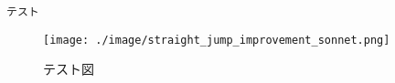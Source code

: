 \documentclass[dvipdfmx]{jsreport}
\begin{document}
\begin{tcolorbox}[colback=white,colframe=black]
\begin{verbatim}
テスト
\end{verbatim}
\end{tcolorbox}

\begin{figure}[htbp]
  \centering
  \texttt{[image: ./image/straight\_jump\_improvement\_sonnet.png]}
  \caption{テスト図}
\end{figure}
\end{document}
